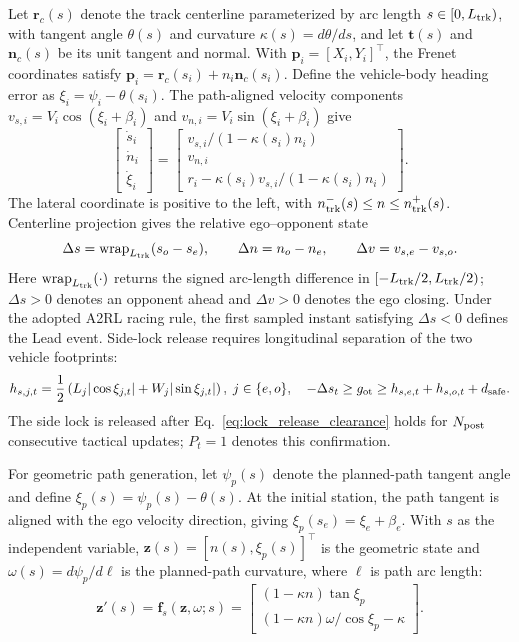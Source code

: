 \documentclass[sensors,article,submit,moreauthors]{Definitions/mdpi}
\begin{document}
Let $\bm r_c(s)$ denote the track centerline parameterized by arc length
$s\in[0,L_{\rm trk})$, with tangent angle $\theta(s)$ and curvature
$\kappa(s)=d\theta/ds$, and let $\bm t(s)$ and $\bm n_c(s)$ be its unit tangent
and normal. With $\bm p_i=[X_i,Y_i]^\top$, the Frenet coordinates satisfy
$\bm p_i=\bm r_c(s_i)+n_i\bm n_c(s_i)$. Define the vehicle-body heading
error as $\xi_i=\psi_i-\theta(s_i)$. The path-aligned velocity components
$v_{s,i}=V_i\cos(\xi_i+\beta_i)$ and
$v_{n,i}=V_i\sin(\xi_i+\beta_i)$ give
\begin{equation}
\begin{bmatrix}\dot s_i\\\dot n_i\\\dot\xi_i\end{bmatrix}
=
\begin{bmatrix}
v_{s,i}/(1-\kappa(s_i)n_i)\\
v_{n,i}\\
r_i-\kappa(s_i)v_{s,i}/(1-\kappa(s_i)n_i)
\end{bmatrix}.
\label{eq:frenet_kinematics}
\end{equation}
The lateral coordinate is positive to the left, with
$n_{\rm trk}^{-}(s)\le n\le n_{\rm trk}^{+}(s)$.
Centerline projection gives the relative ego--opponent state
\begin{equation}
\Delta s=\operatorname{wrap}_{L_{\rm trk}}(s_o-s_e),
\qquad \Delta n=n_o-n_e,\qquad \Delta v=v_{s,e}-v_{s,o}.
\label{eq:rel}
\end{equation}
Here $\operatorname{wrap}_{L_{\rm trk}}(\cdot)$ returns the signed
arc-length difference in $[-L_{\rm trk}/2,L_{\rm trk}/2)$;
$\Delta s>0$ denotes an opponent ahead and $\Delta v>0$ denotes
the ego closing. Under the adopted A2RL racing rule, the first sampled
instant satisfying $\Delta s<0$ defines the Lead event. Side-lock release
requires longitudinal separation of the two vehicle footprints:
\begin{equation}
h_{s,j,t}=\frac12\left(L_j|\cos\xi_{j,t}|+W_j|\sin\xi_{j,t}|\right),
\;j\in\{e,o\},\quad
-\Delta s_t\ge g_{\rm ot}\ge
h_{s,e,t}+h_{s,o,t}+d_{\rm safe}.
\label{eq:lock_release_clearance}
\end{equation}
The side lock is released after Eq.~\eqref{eq:lock_release_clearance} holds
for $N_{\rm post}$ consecutive tactical updates; $P_t=1$ denotes this
confirmation.


For geometric path generation, let $\psi_p(s)$ denote the planned-path tangent
angle and define $\xi_p(s)=\psi_p(s)-\theta(s)$. At the initial station, the
path tangent is aligned with the ego velocity direction, giving
$\xi_p(s_e)=\xi_e+\beta_e$. With $s$ as the independent variable,
$\bm z(s)=[n(s),\xi_p(s)]^\top$ is the geometric state and
$\omega(s)=d\psi_p/d\ell$ is the planned-path curvature, where $\ell$ is path
arc length:
\begin{equation}
\bm z'(s)=\bm f_s(\bm z,\omega;s)=
\begin{bmatrix}
(1-\kappa n)\tan\xi_p\\[2pt]
(1-\kappa n)\omega/\cos\xi_p-\kappa
\end{bmatrix}.
\label{eq:spatial_model}
\end{equation}
\end{document}
